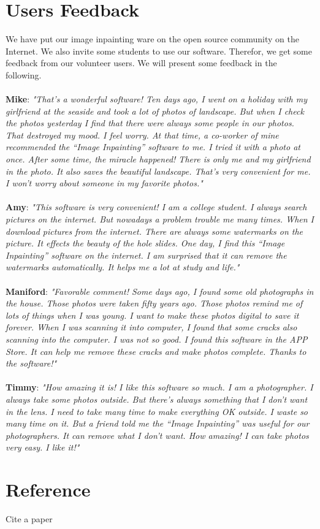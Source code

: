 \documentclass[12pt]{article}
\begin{document}
\section{Users Feedback}
\qquad We have put our image inpainting ware on the open source community on the Internet. We also invite some students to use our software. Therefor, we get some feedback from our volunteer users. We will present some feedback in the following. \\ \ \\
\textbf{Mike}: \emph{"That’s a wonderful software! Ten days ago, I went on a holiday with my girlfriend at the seaside and took a lot of photos of landscape. But when I check the photos yesterday I find that there were always some people in our photos. That destroyed my mood. I feel worry. At that time, a co-worker of mine recommended the “Image Inpainting” software to me. I tried it with a photo at once. After some time, the miracle happened! There is only me and my girlfriend in the photo. It also saves the beautiful landscape. That’s very convenient for me. I won’t worry about someone in my favorite photos."}\\ \\
\textbf{Amy}: \emph{"This software is very convenient! I am a college student. I always search pictures on the internet. But nowadays a problem trouble me many times. When I download pictures from the internet. There are always some watermarks on the picture. It effects the beauty of the hole slides. One day, I find this “Image Inpainting” software on the internet. I am surprised that it can remove the watermarks automatically. It helps me a lot at study and life."} \\ \\
\textbf{Maniford}: \emph{"Favorable comment! Some days ago, I found some old photographs in the house. Those photos were taken fifty years ago. Those photos remind me of lots of things when I was young. I want to make these photos digital to save it forever. When I was scanning it into computer, I found that some cracks also scanning into the computer. I was not so good. I found this software in the APP Store. It can help me remove these cracks and make photos complete. Thanks to the software!"}\\ \\
\textbf{Timmy}: \emph{"How amazing it is! I like this software so much. I am a photographer. I always take some photos outside. But there’s always something that I don’t want in the lens. I need to take many time to make everything OK outside. I waste so many time on it. But a friend told me the “Image Inpainting” was useful for our photographers. It can remove what I don’t want. How amazing! I can take photos very easy. I like it!"}


\section{Reference}









\newpage
Cite a paper\cite{DBLP:conf/siggraph/BertalmioSCB00}


\end{document}
